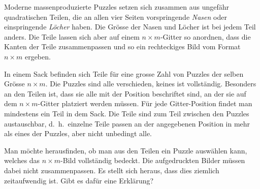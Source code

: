 Moderne massenproduzierte Puzzles setzen sich zusammen aus ungefähr
quadratischen Teilen, die an allen vier Seiten vorspringende {\em Nasen} oder
einspringende {\em Löcher} haben.
Die Grösse der Nasen und Löcher ist bei jedem Teil anders.
Die Teile lassen sich aber auf einem $n\times m$-Gitter so anordnen,
dass die Kanten der Teile zusammenpassen und so ein rechteckiges Bild
vom Format $n\times m$ ergeben.

\begin{center}
\end{center}

In einem Sack befinden sich Teile für eine grosse Zahl von Puzzles der
selben Grösse $n\times m$.
Die Puzzles sind alle verschieden, keines ist vollständig.
Besonders an den Teilen ist, dass sie alle mit der Position beschriftet
sind, an der sie auf dem $n\times m$-Gitter platziert werden müssen.
Für jede Gitter-Position findet man mindestens ein Teil in dem Sack.
Die Teile sind zum Teil zwischen den Puzzles austauschbar, d.~h.~einzelne
Teile passen an der angegebenen Position in mehr als eines der Puzzles,
aber nicht unbedingt alle.

Man möchte herausfinden, ob man aus den Teilen ein Puzzle auswählen kann,
welches das $n\times m$-Bild vollständig bedeckt.
Die aufgedruckten Bilder müssen dabei nicht zusammenpassen.
Es stellt sich heraus, dass dies ziemlich zeitaufwendig ist.
Gibt es dafür eine Erklärung?


